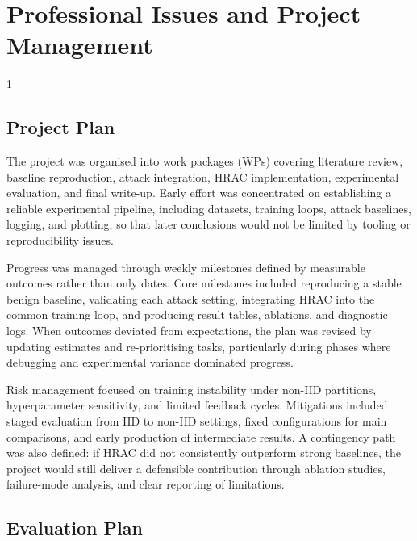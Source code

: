 \doublespacing %

\chapter{Professional Issues and Project Management}
\label{chLast}

\begin{spacing}{1}
\minitoc
\end{spacing}
\thesisspacing

\section{Project Plan}

The project was organised into work packages (WPs) covering literature review, baseline reproduction, attack integration, HRAC implementation, experimental evaluation, and final write-up. Early effort was concentrated on establishing a reliable experimental pipeline, including datasets, training loops, attack baselines, logging, and plotting, so that later conclusions would not be limited by tooling or reproducibility issues.

Progress was managed through weekly milestones defined by measurable outcomes rather than only dates. Core milestones included reproducing a stable benign baseline, validating each attack setting, integrating HRAC into the common training loop, and producing result tables, ablations, and diagnostic logs. When outcomes deviated from expectations, the plan was revised by updating estimates and re-prioritising tasks, particularly during phases where debugging and experimental variance dominated progress.

Risk management focused on training instability under non-IID partitions, hyperparameter sensitivity, and limited feedback cycles. Mitigations included staged evaluation from IID to non-IID settings, fixed configurations for main comparisons, and early production of intermediate results. A contingency path was also defined: if HRAC did not consistently outperform strong baselines, the project would still deliver a defensible contribution through ablation studies, failure-mode analysis, and clear reporting of limitations.

\section{Evaluation Plan}

